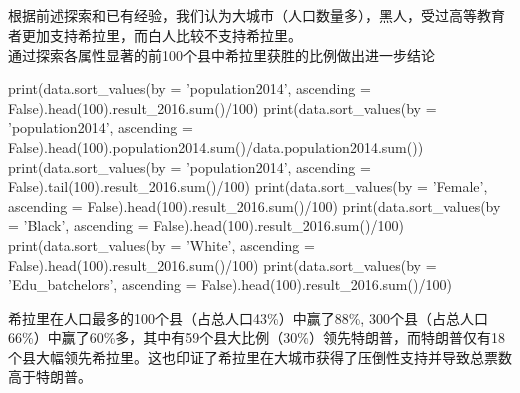 \documentclass[
12pt, %
UTF8
]{fphw}
\begin{document}
	\subsection{}
	根据前述探索和已有经验，我们认为大城市（人口数量多），黑人，受过高等教育者更加支持希拉里，而白人比较不支持希拉里。\\
	通过探索各属性显著的前100个县中希拉里获胜的比例做出进一步结论\\
	\begin{python}
		print(data.sort_values(by = 'population2014', ascending = False).head(100).result_2016.sum()/100)
		print(data.sort_values(by = 'population2014', 
		ascending = False).head(100).population2014.sum()/data.population2014.sum())
		print(data.sort_values(by = 'population2014', ascending = False).tail(100).result_2016.sum()/100)
		print(data.sort_values(by = 'Female', ascending = False).head(100).result_2016.sum()/100)
		print(data.sort_values(by = 'Black', ascending = False).head(100).result_2016.sum()/100)
		print(data.sort_values(by = 'White', ascending = False).head(100).result_2016.sum()/100)
		print(data.sort_values(by = 'Edu_batchelors', ascending = False).head(100).result_2016.sum()/100)
	\end{python}
	\begin{figure}[H]
	\end{figure}
	希拉里在人口最多的100个县（占总人口43\%）中赢了88\%, 300个县（占总人口66\%）中赢了60\%多，其中有59个县大比例（30\%）领先特朗普，而特朗普仅有18个县大幅领先希拉里。这也印证了希拉里在大城市获得了压倒性支持并导致总票数高于特朗普。
\end{document}
